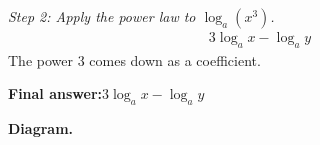 \documentclass[11pt]{article}
\begin{document}
\textit{Step 2: Apply the power law to \( \log_a(x^3) \).}
\[\begin{gathered}
3\log_a x - \log_a y
\end{gathered}\]
The power 3 comes down as a coefficient.

\begin{answerbox}
\textbf{Final answer:}\quad \(\displaystyle  3\log_a x - \log_a y \)
\end{answerbox}
\textbf{Diagram.}

\begin{center}
\end{center}
\end{document}
